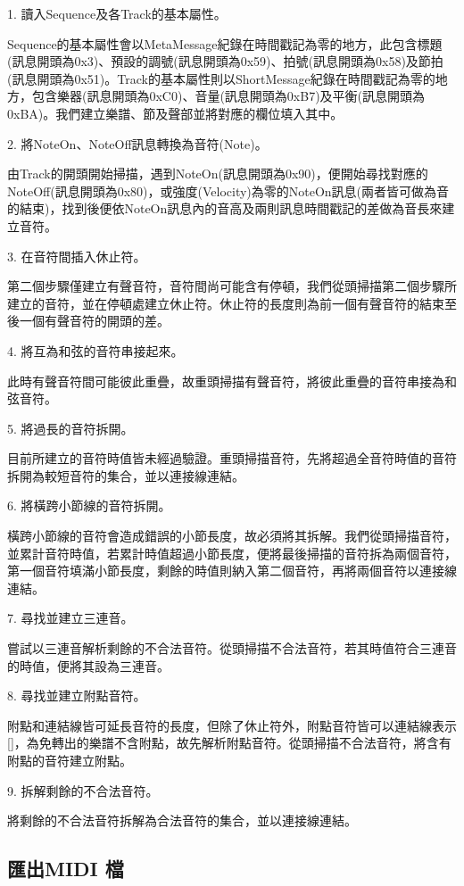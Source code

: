 \documentclass[12pt,a4paper,oneside]{report}
\begin{document}
1. 讀入Sequence及各Track的基本屬性。 

Sequence的基本屬性會以MetaMessage紀錄在時間戳記為零的地方，此包含標題(訊息開頭為0x3)、預設的調號(訊息開頭為0x59)、拍號(訊息開頭為0x58)及節拍(訊息開頭為0x51)。Track的基本屬性則以ShortMessage紀錄在時間戳記為零的地方，包含樂器(訊息開頭為0xC0)、音量(訊息開頭為0xB7)及平衡(訊息開頭為0xBA)。我們建立樂譜、節及聲部並將對應的欄位填入其中。

2. 將NoteOn、NoteOff訊息轉換為音符(Note)。 

由Track的開頭開始掃描，遇到NoteOn(訊息開頭為0x90)，便開始尋找對應的NoteOff(訊息開頭為0x80)，或強度(Velocity)為零的NoteOn訊息(兩者皆可做為音的結束)，找到後便依NoteOn訊息內的音高及兩則訊息時間戳記的差做為音長來建立音符。

3. 在音符間插入休止符。 

第二個步驟僅建立有聲音符，音符間尚可能含有停頓，我們從頭掃描第二個步驟所建立的音符，並在停頓處建立休止符。休止符的長度則為前一個有聲音符的結束至後一個有聲音符的開頭的差。

4. 將互為和弦的音符串接起來。 

此時有聲音符間可能彼此重疊，故重頭掃描有聲音符，將彼此重疊的音符串接為和弦音符。

5. 將過長的音符拆開。 

目前所建立的音符時值皆未經過驗證。重頭掃描音符，先將超過全音符時值的音符拆開為較短音符的集合，並以連接線連結。

6. 將橫跨小節線的音符拆開。

橫跨小節線的音符會造成錯誤的小節長度，故必須將其拆解。我們從頭掃描音符，並累計音符時值，若累計時值超過小節長度，便將最後掃描的音符拆為兩個音符，第一個音符填滿小節長度，剩餘的時值則納入第二個音符，再將兩個音符以連接線連結。

7. 尋找並建立三連音。 

嘗試以三連音解析剩餘的不合法音符。從頭掃描不合法音符，若其時值符合三連音的時值，便將其設為三連音。

8. 尋找並建立附點音符。

附點和連結線皆可延長音符的長度，但除了休止符外，附點音符皆可以連結線表示[]，為免轉出的樂譜不含附點，故先解析附點音符。從頭掃描不合法音符，將含有附點的音符建立附點。

9. 拆解剩餘的不合法音符。

將剩餘的不合法音符拆解為合法音符的集合，並以連接線連結。

\subsection{匯出MIDI 檔} %
\end{document}
